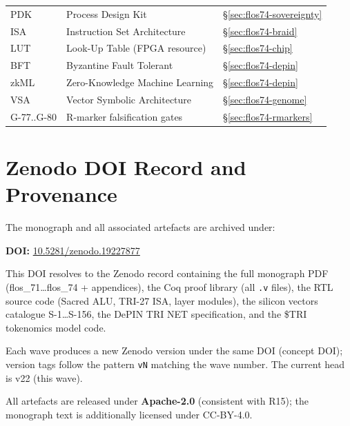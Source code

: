 \begin{table}[h]
\begin{tabular}{lll}
PDK & Process Design Kit & \S\ref{sec:flos74-sovereignty} \\
ISA & Instruction Set Architecture & \S\ref{sec:flos74-braid} \\
LUT & Look-Up Table (FPGA resource) & \S\ref{sec:flos74-chip} \\
BFT & Byzantine Fault Tolerant & \S\ref{sec:flos74-depin} \\
zkML & Zero-Knowledge Machine Learning & \S\ref{sec:flos74-depin} \\
VSA & Vector Symbolic Architecture & \S\ref{sec:flos74-genome} \\
G-77..G-80 & R-marker falsification gates & \S\ref{sec:flos74-rmarkers} \\
\hline
\end{tabular}
\end{table}


\section{Zenodo DOI Record and Provenance}
\label{sec:flos74-zenodo}

The monograph and all associated artefacts are archived under:
\begin{center}
  \textbf{DOI:} \href{https://doi.org/10.5281/zenodo.19227877}{10.5281/zenodo.19227877}
\end{center}

This DOI resolves to the Zenodo record containing the full monograph PDF
(flos\_71\ldots flos\_74 + appendices), the Coq proof library (all \texttt{.v}
files), the RTL source code (Sacred ALU, TRI-27 ISA, layer modules), the silicon
vectors catalogue S-1\ldots S-156, the DePIN TRI NET specification, and the
\$TRI tokenomics model code.

Each wave produces a new Zenodo version under the same DOI (concept DOI);
version tags follow the pattern \texttt{vN} matching the wave number.
The current head is v22 (this wave).

All artefacts are released under \textbf{Apache-2.0} (consistent with R15);
the monograph text is additionally licensed under CC-BY-4.0.


